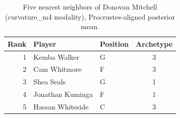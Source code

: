 \begin{table}[htbp]
  \centering\small
  \begin{tabular}{rllc}
    \toprule
    Rank & Player & Position & Archetype \\
    \midrule
    1 & Kemba Walker & G & 3 \\
    2 & Cam Whitmore & F & 3 \\
    3 & Shea Seals & G & 1 \\
    4 & Jonathan Kuminga & F & 1 \\
    5 & Hassan Whiteside & C & 3 \\
    \bottomrule
  \end{tabular}
  \caption{Five nearest neighbors of Donovan Mitchell (curvature_m4 modality), Procrustes-aligned posterior mean.}
  \label{tab:Donovan_Mitchell_neighbors_curvature_m4}
\end{table}

